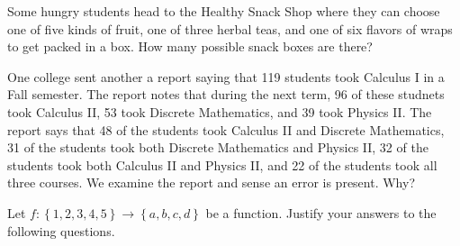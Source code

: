 \documentclass[11pt,answers,addpoints]{exam}
\def\set#1{\left\{ {#1} \right\}}
\begin{document}
\begin{questions}







\question[10] Some hungry students head to the Healthy Snack Shop where they can choose one of five kinds of fruit, one of three herbal teas, and one of six flavors of wraps to get packed in a box. How many possible snack boxes are there?

\vfill

\question[15] One college sent another a report saying that 119 students took Calculus I in a Fall semester. The report notes that during the next term, 96 of these studnets took Calculus II, 53 took Discrete Mathematics, and 39 took Physics II. The report says that 48 of the students took Calculus II and Discrete Mathematics, 31 of the students took both Discrete Mathematics and Physics II, 32 of the students took both Calculus II and Physics II, and 22 of the students took all three courses. We examine the report and sense an error is present. Why?

\begin{solution}

\end{solution}

\vfill

\newpage

\question[8] Let $f : \set{1,2,3,4,5} \to \set{a,b,c,d}$ be a function. Justify your answers to the following questions.

\end{questions}
\end{document}

